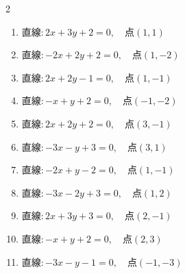 \begin{multicols}{2}
\begin{enumerate}

  \item $直線:2x+3y+2=0,\quad 点 ( 1, 1 )$


  \item $直線:-2x+2y+2=0,\quad 点 ( 1, -2 )$


  \item $直線:2x+2y-1=0,\quad 点 ( 1, -1 )$


  \item $直線:-x+y+2=0,\quad 点 ( -1, -2 )$


  \item $直線:2x+2y+2=0,\quad 点 ( 3, -1 )$


  \item $直線:-3x-y+3=0,\quad 点 ( 3, 1 )$


  \item $直線:-2x+y-2=0,\quad 点 ( 1, -1 )$


  \item $直線:-3x-2y+3=0,\quad 点 ( 1, 2 )$


\columnbreak %

\resetques

  \item $直線:2x+3y+3=0,\quad 点 ( 2, -1 )$


  \item $直線:-x+y+2=0,\quad 点 ( 2, 3 )$


  \item $直線:-3x-y-1=0,\quad 点 ( -1, -3 )$



\end{enumerate}
\end{multicols}
